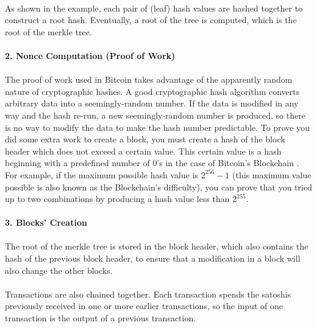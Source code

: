 \\
As shown in the example, each pair of (leaf) hash values are hashed together to construct a root hash. Eventually, a root of the tree is computed, which is the root of the merkle tree.\\
\\ 
\textbf{\large{2. Nonce Computation (Proof of Work) \cite{merkle2}}}\\ 
\\ 
The proof of work used in Bitcoin takes advantage of the apparently random nature of cryptographic hashes. A good cryptographic hash algorithm converts arbitrary data into a seemingly-random number. If the data is modified in any way and the hash re-run, a new seemingly-random number is produced, so there is no way to modify the data to make the hash number predictable. To prove you did some extra work to create a block, you must create a hash of the block header which does not exceed a certain value. This certain value is a hash beginning with a predefined number of 0's in the case of Bitcoin's Blockchain . For example, if the maximum possible hash value is $2^{256} -1$ (this maximum value possible is also known as the Blockchain's difficulty), you can prove that you tried up to two combinations by producing a hash value less than $2^{255}$.\\
\\
\textbf{\large{3. Blocks' Creation\cite{merkle2}}}\\
\\
The root of the merkle tree is stored in the block header, which also contains the hash of the previous block header, to ensure that a modification in a block will also change the other blocks.\\
\\   
Transactions are also chained together. Each transaction spends the satoshis previously received in one or more earlier transactions, so the input of one transaction is the output of a previous transaction. \\
